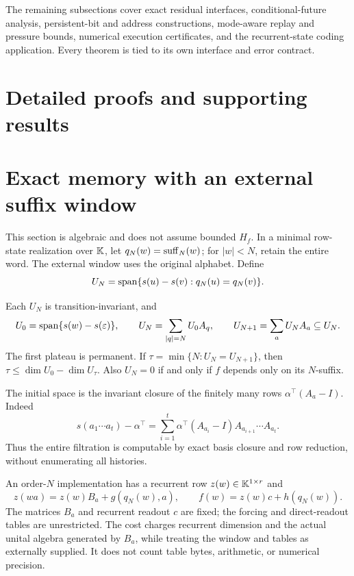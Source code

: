 The remaining subsections cover exact residual interfaces,
conditional-future analysis, persistent-bit and address constructions,
mode-aware replay and pressure bounds, numerical execution certificates,
and the recurrent-state coding application. Every theorem is tied to its
own interface and error contract.
\label{III:III:main-end}

\section*{Detailed proofs and supporting results}

\section{Exact memory with an external suffix window}\label{III:S:sec:window}
This section is algebraic and does not assume bounded $H_f$. In a minimal row-state realization over $\mathbb K$, let $q_N(w)=\operatorname{suff}_N(w)$; for $|w|<N$, retain the entire word. The external window uses the original alphabet. Define
\[
 U_N=\operatorname{span}\{s(u)-s(v):q_N(u)=q_N(v)\}.
\]
\begin{theorem}\label{III:S:thm:filtration}
Each $U_N$ is transition-invariant, and
\[
 U_0=\operatorname{span}\{s(w)-s(\varepsilon)\},\qquad
 U_N=\sum_{|q|=N}U_0A_q,\qquad
 U_{N+1}=\sum_aU_NA_a\subseteq U_N.
\]
The first plateau is permanent. If $\tau=\min\{N:U_N=U_{N+1}\}$, then $\tau\le\dim U_0-\dim U_\tau$. Also $U_N=0$ if and only if $f$ depends only on its $N$-suffix.
\end{theorem}

The initial space is the invariant closure of the finitely many rows $\alpha^\top(A_a-I)$. Indeed
\[
 s(a_1\cdots a_t)-\alpha^\top
 =\sum_{i=1}^t\alpha^\top(A_{a_i}-I)A_{a_{i+1}}\cdots A_{a_t}.
\]
Thus the entire filtration is computable by exact basis closure and row reduction, without enumerating all histories.

\begin{definition}\label{III:S:def:affine-interface}
An order-$N$ implementation has a recurrent row $z(w)\in\mathbb K^{1\times r}$ and
\[
 z(wa)=z(w)B_a+g(q_N(w),a),\qquad
 f(w)=z(w)c+h(q_N(w)).
\]
The matrices $B_a$ and recurrent readout $c$ are fixed; the forcing and direct-readout tables are unrestricted. The cost charges recurrent dimension and the actual unital algebra generated by $B_a$, while treating the window and tables as externally supplied. It does not count table bytes, arithmetic, or numerical precision.
\end{definition}

